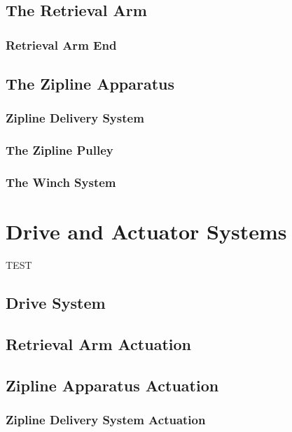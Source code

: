 \documentclass[11pt, oneside]{article} %
\begin{document}
	\subsection{The Retrieval Arm}

		\subsubsection{Retrieval Arm End}

	\subsection{The Zipline Apparatus}
		\subsubsection{Zipline Delivery System}
	
		\subsubsection{The Zipline Pulley}
	
		\subsubsection{The Winch System}

\section{Drive and Actuator Systems}


TEST
	\subsection{Drive System}
	
	\subsection{Retrieval Arm Actuation}
	
	\subsection{Zipline Apparatus Actuation}
	
		\subsubsection{Zipline Delivery System Actuation}
		
\end{document}

